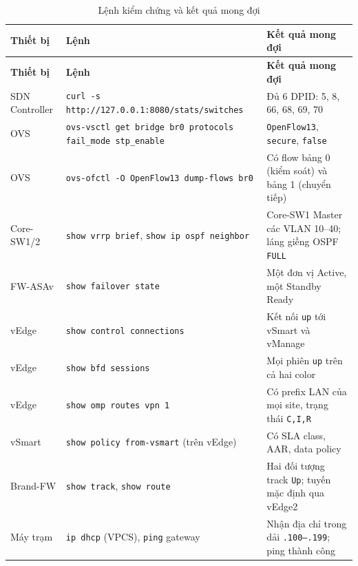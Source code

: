 \begingroup
\small
\setlength{\tabcolsep}{4pt}
\begin{longtable}{|L{2.6cm}|L{5.4cm}|L{\dimexpr\textwidth-2.6cm-5.4cm-6\arrayrulewidth\relax}|}
    \caption{Lệnh kiểm chứng và kết quả mong đợi}\label{tab:lenh_kiem_chung} \\
    \hline
    \textbf{Thiết bị} & \textbf{Lệnh} & \textbf{Kết quả mong đợi} \\
    \hline
    \endfirsthead
    \hline
    \textbf{Thiết bị} & \textbf{Lệnh} & \textbf{Kết quả mong đợi} \\
    \hline
    \endhead
    \hline
    \endfoot
    SDN Controller & \texttt{curl -s http://127.0.0.1:8080/\allowbreak stats/switches} & Đủ 6 DPID: 5, 8, 66, 68, 69, 70 \\
    \hline
    OVS & \texttt{ovs-vsctl get bridge br0 protocols fail\_mode stp\_enable} & \texttt{OpenFlow13}, \texttt{secure}, \texttt{false} \\
    \hline
    OVS & \texttt{ovs-ofctl -O OpenFlow13 dump-flows br0} & Có flow bảng 0 (kiểm soát) và bảng 1 (chuyển tiếp) \\
    \hline
    Core-SW1/2 & \texttt{show vrrp brief}, \texttt{show ip ospf neighbor} & Core-SW1 Master các VLAN 10--40; láng giềng OSPF \texttt{FULL} \\
    \hline
    FW-ASAv & \texttt{show failover state} & Một đơn vị Active, một Standby Ready \\
    \hline
    vEdge & \texttt{show control connections} & Kết nối \texttt{up} tới vSmart và vManage \\
    \hline
    vEdge & \texttt{show bfd sessions} & Mọi phiên \texttt{up} trên cả hai color \\
    \hline
    vEdge & \texttt{show omp routes vpn 1} & Có prefix LAN của mọi site, trạng thái \texttt{C,I,R} \\
    \hline
    vSmart & \texttt{show policy from-vsmart} (trên vEdge) & Có SLA class, AAR, data policy \\
    \hline
    Brand-FW & \texttt{show track}, \texttt{show route} & Hai đối tượng track \texttt{Up}; tuyến mặc định qua vEdge2 \\
    \hline
    Máy trạm & \texttt{ip dhcp} (VPCS), \texttt{ping} gateway & Nhận địa chỉ trong dải \texttt{.100--.199}; ping thành công \\
\end{longtable}
\endgroup

